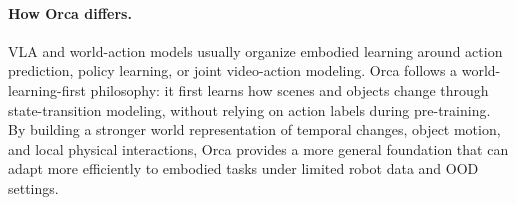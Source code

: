 \vspace{-0.5em}
\paragraph{How Orca differs.}
VLA and world-action models usually organize embodied learning around action prediction, policy learning, or joint video-action modeling.
Orca follows a world-learning-first philosophy: it first learns how scenes and objects change through state-transition modeling, without relying on action labels during pre-training.
By building a stronger world representation of temporal changes, object motion, and local physical interactions, Orca provides a more general foundation that can adapt more efficiently to embodied tasks under limited robot data and OOD settings.